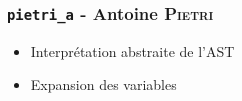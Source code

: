 \subsubsection{\texttt{pietri\_a} - Antoine \textsc{Pietri}}

\begin{itemize}
    \item Interprétation abstraite de l'AST
    \item Expansion des variables
\end{itemize}

